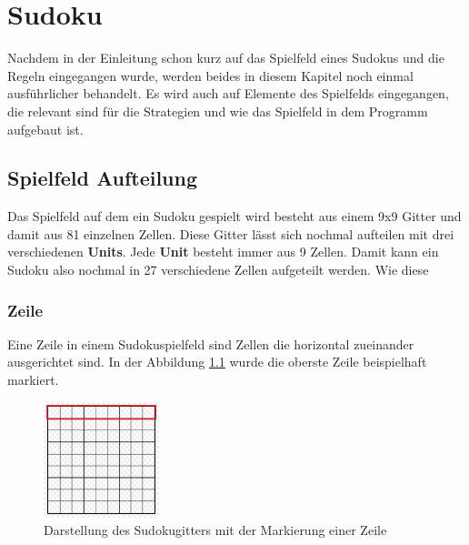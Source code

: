 

\chapter{Sudoku}
Nachdem in der Einleitung schon kurz auf das Spielfeld eines Sudokus und die Regeln eingegangen wurde, werden beides in diesem Kapitel noch einmal ausführlicher behandelt. Es wird auch auf Elemente des Spielfelds eingegangen, die relevant sind für die Strategien und wie das Spielfeld in dem Programm aufgebaut ist. 


\section{Spielfeld Aufteilung}
Das Spielfeld auf dem ein Sudoku gespielt wird besteht aus einem 9x9 Gitter und damit aus 81 einzelnen Zellen. Diese Gitter lässt sich nochmal aufteilen mit drei verschiedenen \textbf{Units}. Jede \textbf{Unit} besteht immer aus 9 Zellen. Damit kann ein Sudoku also nochmal in 27 verschiedene Zellen aufgeteilt werden. Wie diese  

\subsection{Zeile}
Eine Zeile in einem Sudokuspielfeld sind Zellen die horizontal zueinander ausgerichtet sind. In der Abbildung \ref{fig:SudokugitterZeile} wurde die oberste Zeile beispielhaft markiert.
\begin{figure}[htbp]
	\centering
	\includegraphics[width=0.3\textwidth]{images/sudokugitterZeile.jpg}
	\caption{Darstellung des Sudokugitters mit der Markierung einer Zeile}
	\label{fig:SudokugitterZeile}
\end{figure}

